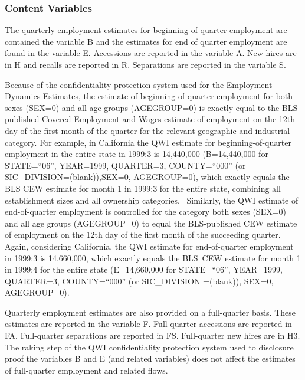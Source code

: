 \subsubsection{Content Variables}

 

The quarterly employment estimates for beginning of quarter employment are
contained the variable \textsf{B} and the estimates for end of quarter
employment are found in the variable \textsf{E}. Accessions are reported in
the variable \textsf{A}. New hires are in \textsf{H} and recalls are
reported in \textsf{R}. Separations are reported in the variable \textsf{S}.

Because of the confidentiality protection system used for the Employment
Dynamics Estimates, the estimate of beginning-of-quarter employment for both
sexes (\textsf{SEX}=0) and all age groups (\textsf{AGEGROUP}=0) is exactly
equal to the BLS-published Covered Employment and Wages estimate of
employment on the 12th day of the first month of the quarter for the
relevant geographic and industrial category. For example, in California the
QWI estimate for beginning-of-quarter employment in the entire state in
1999:3 is 14,440,000 (\textsf{B}=14,440,000 for \textsf{STATE}=``06'', 
\textsf{YEAR}=1999, \textsf{QUARTER}=3, \textsf{COUNTY}=``000'' (or \textsf{%
SIC\_DIVISION}=(blank)),\textsf{SEX}=0, \textsf{AGEGROUP}=0), which exactly
equals the BLS CEW estimate for month 1 in 1999:3 for the entire state,
combining all establishment sizes and all ownership categories. \ Similarly,
the QWI estimate of end-of-quarter employment is controlled for the category
both sexes (\textsf{SEX}=0) and all age groups (\textsf{AGEGROUP}=0) to
equal the BLS-published CEW estimate of employment on the 12th day of the
first month of the succeeding quarter. Again, considering California, the
QWI estimate for end-of-quarter employment in 1999:3 is 14,660,000, which
exactly equals the BLS\ CEW estimate for month 1 in 1999:4 for the entire
state (\textsf{E}=14,660,000 for \textsf{STATE}=``06'', \textsf{YEAR}=1999, 
\textsf{QUARTER}=3, \textsf{COUNTY}=``000'' (or \textsf{SIC\_DIVISION}%
=(blank)), \textsf{SEX}=0, \textsf{AGEGROUP}=0). 

Quarterly employment estimates are also provided on a full-quarter basis.
These estimates are reported in the variable \textsf{F}. Full-quarter
accessions are reported in \textsf{FA}. Full-quarter separations are
reported in \textsf{FS}. Full-quarter new hires are in \textsf{H3. }The
raking step of the QWI confidentiality protection system used to disclosure
proof the variables \textsf{B} and \textsf{E} (and related variables) does
not affect the estimates of full-quarter employment and related flows.

